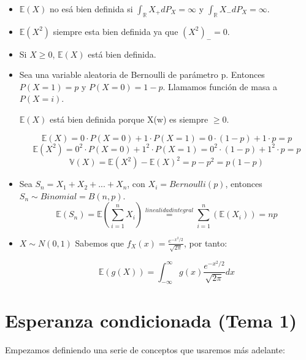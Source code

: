 \documentclass{apuntes}
\begin{document}
\begin{example}
\begin{itemize}
\item $\mathbb{E}(X)$ no esá bien definida si $\int_{\mathbb{R}}X_+ dP_X=\infty$ y $\int_{\mathbb{R}}X_- dP_X=\infty$.

\item $\mathbb{E}(X^2)$ siempre esta bien definida ya que $(X^2)_-=0$.
\item Si $X \geq 0$, $\mathbb{E}(X)$ está bien definida.
\item Sea una variable aleatoria de Bernoulli de parámetro p. Entonces $P(X=1)=p$ y $P(X=0)=1-p$. Llamamos función de masa a $P(X=i)$.

$\mathbb{E}(X)$ está bien definida porque X(w) es siempre $\geq 0$.

\[
\mathbb{E}(X)=0\cdot P(X=0)+1\cdot P(X=1)=0\cdot(1-p)+1\cdot p=p
\]
\[
\mathbb{E}(X^2)=0^2\cdot P(X=0)+1^2\cdot P(X=1)=0^2\cdot(1-p)+1^2\cdot p=p
\]
\[
\mathbb{V}(X)=\mathbb{E}(X^2)-\mathbb{E}(X)^2=p-p^2=p(1-p)
\]
\item Sea $S_n=X_1+X_2+...+X_n$, con $X_i=Bernoulli(p)$, entonces $S_n \sim Binomial=B(n,p)$.
\[
\mathbb{E}(S_n)=\mathbb{E}(\sum_{i=1}^{n}X_i)\stackrel{linealidad integral}{=}\sum_{i=1}^{n}(\mathbb{E}(X_i))=np
\]
\item $X\sim N(0,1)$
Sabemos que $f_X(x)=\frac{e^{-x^2/2}}{\sqrt{2\pi}}$, por tanto:

\[
\mathbb{E}(g(X))=\int_{-\infty}^{\infty}g(x)\frac{e^{-x^2/2}}{\sqrt{2\pi}}dx
\]
\end{itemize}
\end{example}

\chapter{Esperanza condicionada (Tema 1)}

Empezamos definiendo una serie de conceptos que usaremos más adelante:
\end{document}
